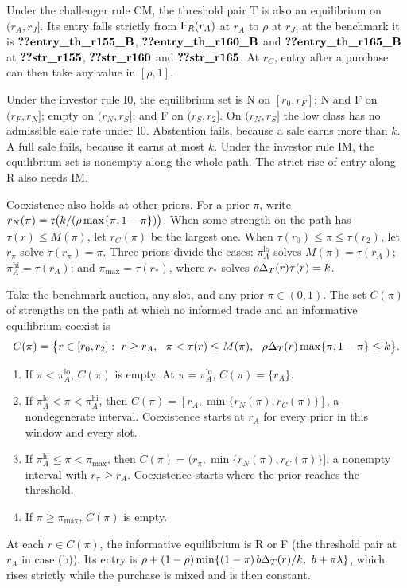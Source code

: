 \begin{remark}\label{rem:ties}
Under the challenger rule CM, the threshold pair T is also an equilibrium on \((r_A,r_J]\). Its entry falls strictly
from \(\mathsf{E}_R(r_A)\) at \(r_A\) to \(\rho\) at \(r_J\); at the benchmark it is \(\reg{entry_th_r155_B}\),
\(\reg{entry_th_r160_B}\) and \(\reg{entry_th_r165_B}\) at \(\reg{str_r155}\), \(\reg{str_r160}\) and
\(\reg{str_r165}\). At \(r_C\), entry after a purchase can then take any value in \([\rho,1]\). 

Under the investor rule I0, the equilibrium set is N on \([r_0,r_F]\); N and F on \((r_F,r_N]\); empty on \((r_N,r_S]\); and F on
\((r_S,r_2]\). On \((r_N,r_S]\) the low class has no admissible sale rate under I0. Abstention fails, because a
sale earns more than \(k\). A full sale fails, because it earns at most \(k\). Under the investor rule IM, the
equilibrium set is nonempty along the whole path. The strict rise of entry along R also needs IM.
\end{remark}

Coexistence also holds at other priors. For a prior \(\pi\), write \(r_N(\pi)=\mathfrak{r}\bigl(k/(\rho\max\{\pi,1-\pi\})\bigr)\).
When some strength on the path has \(\tau(r)\le M(\pi)\), let \(r_C(\pi)\) be the largest one. When
\(\tau(r_0)\le\pi\le\tau(r_2)\), let \(r_\pi\) solve \(\tau(r_\pi)=\pi\). Three priors divide the cases: \(\pi_A^{\mathrm{lo}}\) solves
\(M(\pi)=\tau(r_A)\); \(\pi_A^{\mathrm{hi}}=\tau(r_A)\); and \(\pi_{\max}=\tau(r_*)\), where \(r_*\) solves
\(\rho\Delta_T(r)\tau(r)=k\).

\begin{corollary}\label{prop:priors}
Take the benchmark auction, any slot, and any prior \(\pi\in(0,1)\). The set \(C(\pi)\) of strengths on the path
at which no informed trade and an informative equilibrium coexist is
\[
C(\pi)=\bigl\{r\in[r_0,r_2]:\ r\ge r_A,\ \ \pi<\tau(r)\le M(\pi),\ \ \rho\DT(r)\max\{\pi,1-\pi\}\le k\bigr\}.
\]
\begin{enumerate}[label=(\alph*),leftmargin=2em]
\item If \(\pi<\pi_A^{\mathrm{lo}}\), \(C(\pi)\) is empty. At \(\pi=\pi_A^{\mathrm{lo}}\), \(C(\pi)=\{r_A\}\).
\item If \(\pi_A^{\mathrm{lo}}<\pi<\pi_A^{\mathrm{hi}}\), then \(C(\pi)=[r_A,\min\{r_N(\pi),r_C(\pi)\}]\), a
nondegenerate interval. Coexistence starts at \(r_A\) for every prior in this window and every slot.
\item If \(\pi_A^{\mathrm{hi}}\le\pi<\pi_{\max}\), then \(C(\pi)=(r_\pi,\min\{r_N(\pi),r_C(\pi)\}]\), a nonempty
interval with \(r_\pi\ge r_A\). Coexistence starts where the prior reaches the threshold.
\item If \(\pi\ge\pi_{\max}\), \(C(\pi)\) is empty.
\end{enumerate}
At each \(r\in C(\pi)\), the informative equilibrium is R or F (the threshold pair at \(r_A\) in case (b)). Its
entry is \(\rho+(1-\rho)\min\{(1-\pi)\,b\DT(r)/k,\ b+\pi\lambda\}\), which rises strictly while the purchase is
mixed and is then constant.
\end{corollary}

